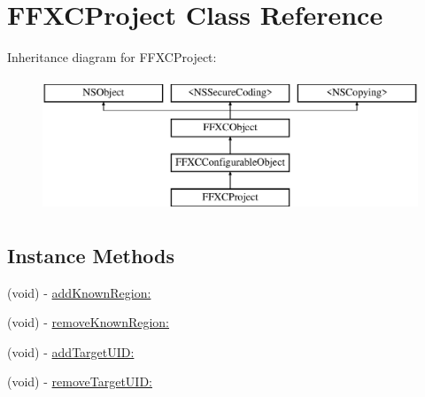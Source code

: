 \hypertarget{interface_f_f_x_c_project}{\section{F\-F\-X\-C\-Project Class Reference}
\label{interface_f_f_x_c_project}
}
Inheritance diagram for F\-F\-X\-C\-Project\-:\begin{figure}[H]
\begin{center}
\leavevmode
\includegraphics[height=4.000000cm]{interface_f_f_x_c_project}
\end{center}
\end{figure}
\subsection*{Instance Methods}
\begin{DoxyCompactItemize}
\item 
(void) -\/ \hyperlink{interface_f_f_x_c_project_aefa164609ff9c5c0317e7f9785c35a36}{add\-Known\-Region\-:}
\item 
(void) -\/ \hyperlink{interface_f_f_x_c_project_a434ac2854fe2423d479770bf1b63cea3}{remove\-Known\-Region\-:}
\item 
(void) -\/ \hyperlink{interface_f_f_x_c_project_af44108d30989f792d0d78d6817e60d32}{add\-Target\-U\-I\-D\-:}
\item 
(void) -\/ \hyperlink{interface_f_f_x_c_project_a6d0df7145384379ba54bb94b4cb11758}{remove\-Target\-U\-I\-D\-:}
\end{DoxyCompactItemize}
